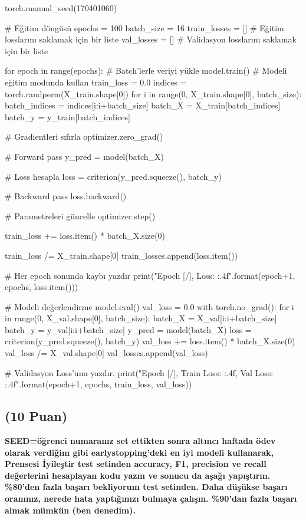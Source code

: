 \documentclass[11pt]{article}
\begin{document}
\begin{python}

torch.manual_seed(170401060)

# Eğitim döngüsü
epochs = 100
batch_size = 16
train_losses = [] # Eğitim losslarını saklamak için bir liste
val_losses = [] # Validasyon losslarını saklamak için bir liste

for epoch in range(epochs):
    # Batch'lerle veriyi yükle
    model.train() # Modeli eğitim modunda kullan
    train_loss = 0.0
    indices = torch.randperm(X_train.shape[0])
    for i in range(0, X_train.shape[0], batch_size):
        batch_indices = indices[i:i+batch_size]
        batch_X = X_train[batch_indices]
        batch_y = y_train[batch_indices]
        
        # Gradientleri sıfırla
        optimizer.zero_grad()
        
        # Forward pass
        y_pred = model(batch_X)
        
        # Loss hesapla
        loss = criterion(y_pred.squeeze(), batch_y)
        
        # Backward pass
        loss.backward()
        
        # Parametreleri güncelle
        optimizer.step()
        
        train_loss += loss.item() * batch_X.size(0)
        
    train_loss /= X_train.shape[0]
    train_losses.append(loss.item())
    
    # Her epoch sonunda kaybı yazdır
    print("Epoch [{}/{}], Loss: {:.4f}".format(epoch+1, epochs, loss.item()))
    

    # Modeli değerlendirme
    model.eval() 
    val_loss = 0.0
    with torch.no_grad():
        for i in range(0, X_val.shape[0], batch_size):
            batch_X = X_val[i:i+batch_size]
            batch_y = y_val[i:i+batch_size]
            y_pred = model(batch_X)
            loss = criterion(y_pred.squeeze(), batch_y)
            val_loss += loss.item() * batch_X.size(0)
        val_loss /= X_val.shape[0]
        val_losses.append(val_loss)
        
        # Validasyon Loss'unu yazdır.
        print("Epoch [{}/{}], Train Loss: {:.4f}, Val Loss: {:.4f}".format(epoch+1, epochs, train_loss, val_loss))
        
\end{python}



\subsection{(10 Puan)} \textbf{SEED=öğrenci numaranız set ettikten sonra altıncı haftada ödev olarak verdiğim gibi earlystopping'deki en iyi modeli kullanarak, Prensesi İyileştir test setinden accuracy, F1, precision ve recall değerlerini hesaplayan kodu yazın ve sonucu da aşağı yapıştırın. \%80'den fazla başarı bekliyorum test setinden. Daha düşükse başarı oranınız, nerede hata yaptığınızı bulmaya çalışın. \%90'dan fazla başarı almak mümkün (ben denedim).}
\end{document}
